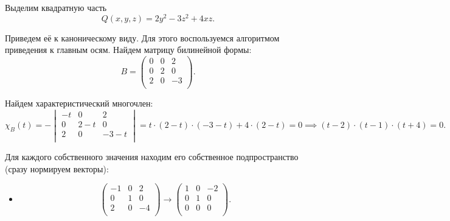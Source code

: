 \documentclass[a4paper]{article}
\begin{document}
    \begin{solution}
        Выделим квадратную часть
        \begin{equation*}
            Q(x, y, z) = 2y^2 - 3z^2 + 4xz.
        \end{equation*}

        Приведем её к каноническому виду. Для этого воспользуемся алгоритмом приведения к главным осям. Найдем матрицу билинейной формы:
        \begin{equation*}
            B = \begin{pmatrix}
                0 & 0 & 2 \\
                0 & 2 & 0 \\
                2 & 0 & -3 \\
            \end{pmatrix}.
        \end{equation*}

        Найдем характеристический многочлен:
        \begin{equation*}
            \chi_B(t) = - \begin{vmatrix}
                -t & 0 & 2 \\
                0 & 2 - t & 0 \\
                2 & 0 & -3 - t \\
            \end{vmatrix}
            = t \cdot (2 - t) \cdot (-3 - t) + 4 \cdot (2 - t) = 0 \implies (t - 2) \cdot (t - 1) \cdot (t + 4) = 0.
        \end{equation*}

        Для каждого собственного значения находим его собственное подпространство (сразу нормируем векторы):
        \begin{itemize}
        \item[\pmb{$t = 1$}]
            \begin{equation*}
                \begin{pmatrix}
                    -1 & 0 & 2 \\
                    0 & 1 & 0 \\
                    2 & 0 & -4 \\
                \end{pmatrix}
                \to
                \begin{pmatrix}
                    1 & 0 & -2 \\
                    0 & 1 & 0 \\
                    0 & 0 & 0 \\
                \end{pmatrix}.
            \end{equation*}


\end{itemize}
\end{solution}
\end{document}
